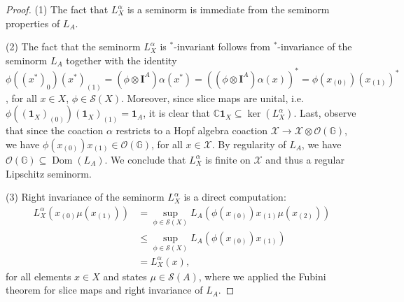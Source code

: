 \documentclass{amsart}
\theoremstyle{plain}
\theoremstyle{definition}
\theoremstyle{remark}
\DeclareMathOperator{\Dom}{Dom}
\begin{document}
	\begin{proof}
		(1)
		The fact that $L_X^\alpha$ is a seminorm is immediate from the seminorm properties of $L_A$.
		
		(2)
		The fact that the seminorm $L_X^\alpha$ is $^*$-invariant follows from $^*$-invariance of the seminorm $L_A$ together with the identity $\phi((x^*)_{0})(x^*)_{(1)} = (\phi \otimes \mathbf{I}^A)\alpha(x^*) = ((\phi \otimes \mathbf{I}^A)\alpha(x))^* = \phi(x_{(0)})(x_{(1)})^*$, for all $x \in X$, $\phi \in \mathcal{S}(X)$.
		Moreover, since slice maps are unital, i.e.\@ $\phi((\mathbf{1}_X)_{(0)}) (\mathbf{1}_X)_{(1)} = \mathbf{1}_A$, it is clear that $\mathbb{C}\mathbf{1}_X \subseteq \ker(L_X^\alpha)$.
		Last, observe that since the coaction $\alpha$ restricts to a Hopf algebra coaction $\mathcal{X} \rightarrow \mathcal{X} \otimes \mathcal{O}(\mathbb{G})$, we have $\phi(x_{(0)})x_{(1)} \in \mathcal{O}(\mathbb{G})$, for all $x \in \mathcal{X}$.
		By regularity of $L_A$, we have $\mathcal{O}(\mathbb{G}) \subseteq \Dom(L_A)$.
		We conclude that $L_X^\alpha$ is finite on $\mathcal{X}$ and thus a regular Lipschitz seminorm.
		
		(3)
		Right invariance of the seminorm $L_X^\alpha$ is a direct computation:
		\begin{align}\label{eqn:Right-invariance}
			L_X^\alpha(x_{(0)}\mu(x_{(1)}))
			&= \sup_{\phi \in \mathcal{S}(X)} L_A(\phi(x_{(0)})x_{(1)}\mu(x_{(2)})) \\
			&\leq \sup_{\phi \in \mathcal{S}(X)} L_A(\phi(x_{(0)})x_{(1)}) \\
			&= L_X^\alpha(x),
		\end{align}
		for all elements $x \in X$ and states $\mu \in \mathcal{S}(A)$, where we applied the Fubini theorem for slice maps and right invariance of $L_A$. 
		

\end{proof}
\end{document}
